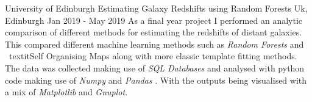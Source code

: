     \cventry
    {University of Edinburgh}
    {Estimating Galaxy Redshifts using Random Forests}
    {Uk, Edinburgh}
    {Jan 2019 - May 2019}
     {%
     As a final year project I performed an analytic comparison of different 
     methods for estimating the redshifts of distant galaxies. This compared 
     different machine learning methods such as \textit{Random Forests} and \
     textit{Self Organising Maps} along with more classic template fitting 
     methods. The data was collected making use of \textit{SQL Databases} and 
     analysed with python code making use of \textit{Numpy} and \textit{Pandas
     }. With the outputs being visualised with a mix of \textit{Matplotlib} 
     and \textit{Gnuplot}.\newline}
   
